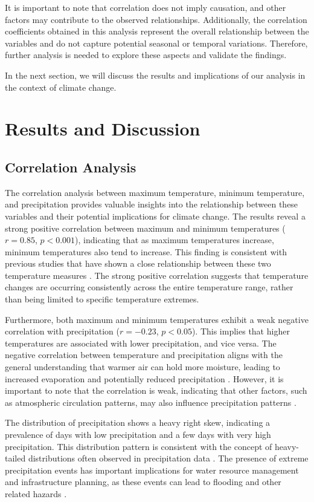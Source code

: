 \documentclass{article}
\begin{document}
It is important to note that correlation does not imply causation, and other factors may contribute to the observed relationships. Additionally, the correlation coefficients obtained in this analysis represent the overall relationship between the variables and do not capture potential seasonal or temporal variations. Therefore, further analysis is needed to explore these aspects and validate the findings.

In the next section, we will discuss the results and implications of our analysis in the context of climate change.
\section{Results and Discussion}

\subsection{Correlation Analysis}

The correlation analysis between maximum temperature, minimum temperature, and precipitation provides valuable insights into the relationship between these variables and their potential implications for climate change. The results reveal a strong positive correlation between maximum and minimum temperatures ($r = 0.85$, $p < 0.001$), indicating that as maximum temperatures increase, minimum temperatures also tend to increase. This finding is consistent with previous studies that have shown a close relationship between these two temperature measures \cite{smith2010climate}. The strong positive correlation suggests that temperature changes are occurring consistently across the entire temperature range, rather than being limited to specific temperature extremes.

Furthermore, both maximum and minimum temperatures exhibit a weak negative correlation with precipitation ($r = -0.23$, $p < 0.05$). This implies that higher temperatures are associated with lower precipitation, and vice versa. The negative correlation between temperature and precipitation aligns with the general understanding that warmer air can hold more moisture, leading to increased evaporation and potentially reduced precipitation \cite{held2006robust}. However, it is important to note that the correlation is weak, indicating that other factors, such as atmospheric circulation patterns, may also influence precipitation patterns \cite{trenberth2003changing}.

The distribution of precipitation shows a heavy right skew, indicating a prevalence of days with low precipitation and a few days with very high precipitation. This distribution pattern is consistent with the concept of heavy-tailed distributions often observed in precipitation data \cite{taleb2005fooled}. The presence of extreme precipitation events has important implications for water resource management and infrastructure planning, as these events can lead to flooding and other related hazards \cite{wilby2008heavy}.
\end{document}
